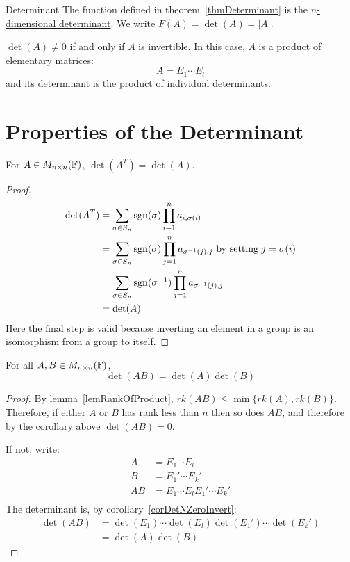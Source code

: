 \documentclass[../Main.tex]{subfiles}
\begin{document}
\begin{definition}{Determinant}
    The function defined in theorem~\ref{thmDeterminant} is the \underline{$n$-dimensional determinant}. We write $F(A) = \det(A) = |A|$.
\end{definition}
\begin{corollary}
    $\det(A) \neq 0$ if and only if $A$ is invertible. In this case, $A$ is a product of elementary matrices:
    \begin{equation*}
        A = E_1 \cdots E_l
    \end{equation*}
    and its determinant is the product of individual determinants.
    \label{corDetNZeroInvert}
\end{corollary}
\section{Properties of the Determinant}
\begin{lemma}
    For $A \in M_{n \times n}(\mathbb{F})$, $\det(A^T) = \det(A)$.
    \label{lemDetTrans}
\end{lemma}
\begin{proof}
    \begin{align*}
        \det(A^T) &= \sum_{\sigma \in S_n} \operatorname{sgn}(\sigma) \prod_{i=1}^{n} a_{i, \sigma(i)} \\
        &= \sum_{\sigma \in S_n} \operatorname{sgn}(\sigma) \prod_{j=1}^{n} a_{\sigma^{-1}(j), j} \text{ by setting } j = \sigma(i) \\
        &= \sum_{\sigma \in S_n} \operatorname{sgn}(\sigma^{-1}) \prod_{j=1}^{n} a_{\sigma^{-1}(j), j} \\
        &= \det(A)
    \end{align*}
    Here the final step is valid because inverting an element in a group is an isomorphism from a group to itself.
\end{proof}
\begin{proposition}
    For all $A, B \in M_{n \times n}(\mathbb{F})$,
    \begin{equation*}
        \det(AB) = \det(A) \det(B)
    \end{equation*}
    \label{propDetProd}
\end{proposition}
\begin{proof}
    By lemma~\ref{lemRankOfProduct}, $rk(AB) \leq \min\{rk(A), rk(B)\}$. Therefore, if either $A$ or $B$ has rank less than $n$ then so does $AB$, and therefore by the corollary above $\det(AB) = 0$.

    If not, write:
    \begin{align*}
        A &= E_1 \cdots E_l \\
        B &= E_1' \cdots E_k' \\
        AB &= E_1 \cdots E_l E_1' \cdots E_k' \\
    \end{align*}
    The determinant is, by corollary~\ref{corDetNZeroInvert}:
    \begin{align*}
        \det(AB) &= \det(E_1) \cdots \det(E_l) \det(E_1') \cdots \det(E_k') \\
        &= \det(A)\det(B)
    \end{align*}
\end{proof}
\end{document}
